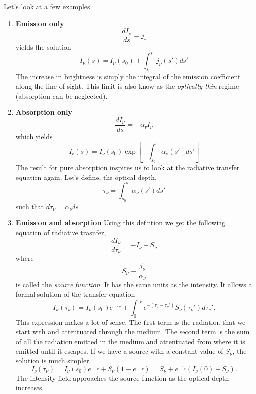 Let's look at a few examples. 
\begin{enumerate}
\item {\bf Emission only}
\begin{equation}
\frac{d I_\nu}{ds} = j_\nu
\label{eq:57}
\end{equation}
yields the solution
\begin{equation}
I_\nu (s) = I_\nu(s_0) + \int_{s_0}^s j_\nu (s') ds'
\label{eq:58}
\end{equation}
The increase in brightness is simply the integral of the emission
coefficient along the line of sight.  This limit is also know as the
{\em optically thin} regime (absorption can be neglected).
\item {\bf Absorption only}
\begin{equation}
\frac{d I_\nu}{ds} = - \alpha_\nu I_\nu 
\label{eq:59}
\end{equation}
which yields
\begin{equation}
I_\nu (s) = I_\nu(s_0) \exp \left [ -\int_{s_0}^s \alpha_\nu (s') ds'
  \right ]
\label{eq:60}
\end{equation}
The result for pure absorption inspires us to look at the radiative
transfer equation again. Let's define, the optical depth,
\begin{equation}
\tau_\nu = \int_{s_0}^s \alpha_\nu (s') ds' 
\label{eq:61}
\end{equation}
such that $d\tau_\nu = \alpha_\nu ds$
\item {\bf Emission and absorption}
Using this defintion we get the following equation of radiative
trasnfer,
\begin{equation}
\frac{d I_\nu}{d\tau_\nu} = -I_\nu + S_\nu
\label{eq:62}
\end{equation}
where 
\begin{equation}
S_\nu \equiv \frac{j_\nu}{\alpha_\nu}
\label{eq:63}
\end{equation}
is called the {\em source function}.  It has the same units as the 
intensity.  It allows a formal solution of the transfer equation
\begin{equation} 
I_\nu (\tau_\nu) = I_\nu(s_0)e^{-\tau_\nu} + \int_0^{\tau_\nu}
e^{-(\tau_\nu - \tau_\nu')} S_\nu(\tau_\nu') d\tau_\nu'.
\label{eq:64}
\end{equation}
This expression makes a lot of sense.  The first term is the radiation
that we start with and attentuated through the medium.  The second
term is the sum of all the radiation emitted in the medium and
attentuated from where it is emitted until it escapes. If we have a
source with a constant value of $S_\nu$, the solution is much simpler
\begin{equation}
I_\nu (\tau_\nu) = I_\nu(s_0)e^{-\tau_\nu} + S_\nu \left ( 1 -
e^{-\tau_\nu} \right ) = S_\nu + e^{-\tau_\nu} \left ( I_\nu(0) - S_\nu
\right ).
\label{eq:65}
\end{equation}
The intensity field approaches the source function as the optical
depth increases.
\end{enumerate}

